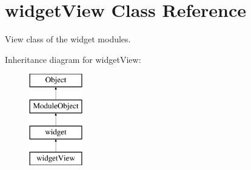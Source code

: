\hypertarget{classwidgetView}{\section{widget\+View Class Reference}
\label{classwidgetView}
}


View class of the widget modules.  


Inheritance diagram for widget\+View\+:\begin{figure}[H]
\begin{center}
\leavevmode
\includegraphics[height=4.000000cm]{classwidgetView}
\end{center}
\end{figure}
